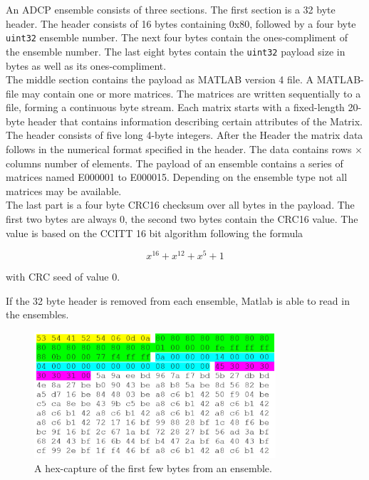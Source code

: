 An ADCP ensemble consists of three sections. The first section is a 32 byte header. The header consists of 16 bytes containing 0x80, followed by a four byte \texttt{uint32} ensemble number. The next four bytes contain the ones-compliment of the ensemble number. The last eight bytes contain the \texttt{uint32} payload size in bytes as well as its ones-compliment.\\
The middle section contains the payload as MATLAB version 4 file. A MATLAB-file may contain one or more matrices. The matrices are written sequentially to a file,  forming a continuous byte stream. Each matrix starts with a fixed-length 20-byte header that contains information describing certain attributes of the Matrix. The header consists of five long 4-byte integers. After the Header the matrix data follows in the numerical format specified in the header. The data contains rows $\times$ columns number of elements.
The payload of an ensemble contains a series of matrices named E000001 to E000015. Depending on the ensemble type not all matrices may be available.\\
The last part is a four byte CRC16 checksum over all bytes in the payload. The first two bytes are always 0, the second two bytes contain the CRC16 value. The value is based on the CCITT 16 bit algorithm following the formula 

$$ x^{16} + x^{12} + x^5 +1$$

with CRC seed of value 0.

If the 32 byte header is removed from each ensemble, Matlab is able to read in the ensembles.
\begin{figure}[h]
\centering
      \includegraphics[width=0.8\textwidth]{hexdump}
        \caption{A hex-capture of the first few bytes from an ensemble.}
\end{figure}

